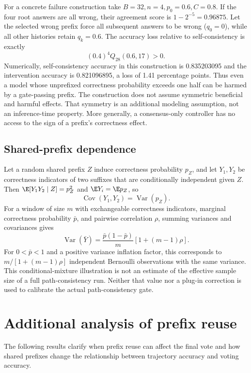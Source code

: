 For a concrete failure construction take $B=32,n=4,p_0=0.6,C=0.8$. If the four root answers are all wrong, their agreement score is $1-2^{-5}=0.96875$. Let the selected wrong prefix force all subsequent answers to be wrong ($q_0=0$), while all other histories retain $q_k=0.6$. The accuracy loss relative to self-consistency is exactly
\[
 (0.4)^4 Q_{28}(0.6,17)>0.
\]
Numerically, self-consistency accuracy in this construction is 0.835203095 and the intervention accuracy is 0.821096895, a loss of 1.41 percentage points. Thus even a model whose unprefixed correctness probability exceeds one half can be harmed by a gate-passing prefix. The construction does not assume symmetric beneficial and harmful effects. That symmetry is an additional modeling assumption, not an inference-time property. More generally, a consensus-only controller has no access to the sign of a prefix's correctness effect.

\subsection{Shared-prefix dependence}
Let a random shared prefix $Z$ induce correctness probability $p_Z$, and let $Y_1,Y_2$ be correctness indicators of two suffixes that are conditionally independent given $Z$. Then $\E[Y_1Y_2\mid Z]=p_Z^2$ and $\E Y_i=\E p_Z$, so
\begin{equation}
 \operatorname{Cov}(Y_1,Y_2)=\operatorname{Var}(p_Z).
 \label{eq:dependence}
\end{equation}
For a window of size $m$ with exchangeable correctness indicators, marginal correctness probability $\bar p$, and pairwise correlation $\rho$, summing variances and covariances gives
\[
 \operatorname{Var}(\bar Y)=\frac{\bar p(1-\bar p)}{m}[1+(m-1)\rho].
\]
For $0<\bar p<1$ and a positive variance inflation factor, this corresponds to $m/[1+(m-1)\rho]$ independent Bernoulli observations with the same variance. This conditional-mixture illustration is not an estimate of the effective sample size of a full path-consistency run. Neither that value nor a plug-in correction is used to calibrate the actual path-consistency gate.

\section{Additional analysis of prefix reuse}
\label{app:additional_math}
The following results clarify when prefix reuse can affect the final vote and how shared prefixes change the relationship between trajectory accuracy and voting accuracy.

